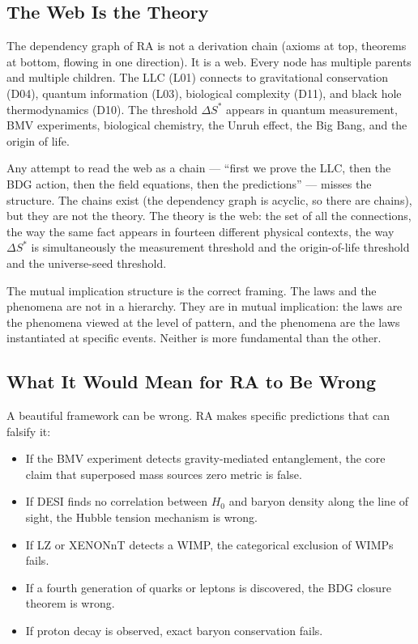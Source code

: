 \documentclass[12pt,a4paper]{article}
\begin{document}
\subsection{The Web Is the Theory}

The dependency graph of RA is not a derivation chain (axioms at top, theorems at bottom, flowing in one direction).  It is a web.  Every node has multiple parents and multiple children.  The LLC (L01) connects to gravitational conservation (D04), quantum information (L03), biological complexity (D11), and black hole thermodynamics (D10).  The threshold $\Delta S^*$ appears in quantum measurement, BMV experiments, biological chemistry, the Unruh effect, the Big Bang, and the origin of life.

Any attempt to read the web as a chain --- ``first we prove the LLC, then the BDG action, then the field equations, then the predictions'' --- misses the structure.  The chains exist (the dependency graph is acyclic, so there are chains), but they are not the theory.  The theory is the web: the set of all the connections, the way the same fact appears in fourteen different physical contexts, the way $\Delta S^*$ is simultaneously the measurement threshold and the origin-of-life threshold and the universe-seed threshold.

The mutual implication structure \cite{RA_MutualImplication} is the correct framing.  The laws and the phenomena are not in a hierarchy.  They are in mutual implication: the laws are the phenomena viewed at the level of pattern, and the phenomena are the laws instantiated at specific events.  Neither is more fundamental than the other.

\subsection{What It Would Mean for RA to Be Wrong}

A beautiful framework can be wrong.  RA makes specific predictions that can falsify it:
\begin{itemize}
  \item If the BMV experiment detects gravity-mediated entanglement, the core claim that superposed mass sources zero metric is false.
  \item If DESI finds no correlation between $H_0$ and baryon density along the line of sight, the Hubble tension mechanism is wrong.
  \item If LZ or XENONnT detects a WIMP, the categorical exclusion of WIMPs fails.
  \item If a fourth generation of quarks or leptons is discovered, the BDG closure theorem is wrong.
  \item If proton decay is observed, exact baryon conservation fails.
\end{itemize}
\end{document}
